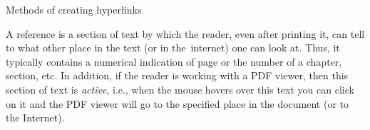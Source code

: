 {{%
%


\sec[links] Methods of creating hyperlinks

A reference is a section of text by which the reader, even after printing it, can tell to what other place in the text (or in the~internet) one can look at. Thus, it typically contains a numerical indication of page or the number of a chapter, section, etc. In addition, if the reader is working with a PDF viewer, then this section of text is {\em active}, i.e., when the mouse hovers over
this text you can click on it and the PDF viewer will go to the specified place in the document (or to the Internet).

}}

